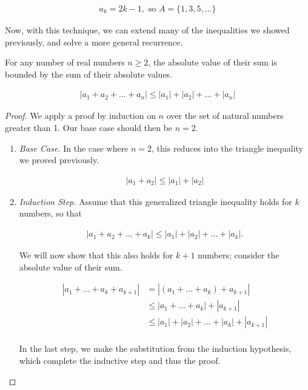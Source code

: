 \documentclass[twoside]{report}
\begin{document}
\begin{align*}
	a_k = 2k - 1, \text{ so } A = \{1, 3, 5, \dots \}
\end{align*}

Now, with this technique, we can extend many of the inequalities we showed previously, and solve a more general recurrence.

\vspace{\baselineskip}
\begin{theorem}
	For any number of real numbers $n \ge 2$, the absolute value of their sum is bounded by the sum of their absolute values.
	
	\begin{align*}
		|a_1 + a_2 + \dots + a_n| \le |a_1| + |a_2| + \dots + |a_n|
	\end{align*}
\end{theorem}
\begin{proof}
	We apply a proof by induction on $n$ over the set of natural numbers greater than 1. Our base case should then be $n = 2$.
	
	\vspace{\baselineskip}
	\begin{enumerate}
		\item \emph{Base Case.} In the case where $n = 2$, this reduces into the triangle inequality we proved previously.
		
		\begin{align*}
			|a_1 + a_2| \le |a_1| + |a_2|
		\end{align*}
		
		\item \emph{Induction Step.} Assume that this generalized triangle inequality holds for $k$ numbers, so that
		
		\begin{align*}
			|a_1 + a_2 + \dots + a_k| \le |a_1| + |a_2| + \dots + |a_k|.
		\end{align*}
		
		 We will now show that this also holds for $k + 1$ numbers;  consider the absolute value of their sum.
		 
		 \begin{align*}
		 	|a_1 + \dots + a_k + a_{k + 1}| &= |(a_1 + \dots + a_k) + a_{k + 1}| \\
		 	&\le |a_1 + \dots + a_k| + |a_{k + 1}| \\
		 	&\le |a_1| + |a_2| + \dots + |a_k| + |a_{k + 1}| \\
		 \end{align*}
		 
		 In the last step, we make the substitution from the induction hypothesis, which complete the inductive step and thus the proof.
	\end{enumerate}
\end{proof}
\vspace{\baselineskip}
\end{document}
